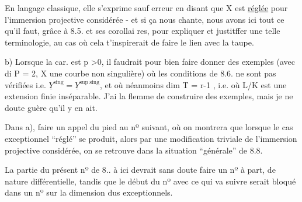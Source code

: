 

En langage classique, elle s'exprime  sauf erreur en disant
que X est \uline{réglée} pour l'immersion projective considérée \hand{[}- et si ça nous
chante, nous avons ici  tout ce qu'il faut, grâce à 8.5. et ses corollai
res, pour expliquer et justitffer une telle terminologie, au cas où cela
t'inspirerait de faire le lien avec la taupe\over{)}{]}. 

b)  Lorsque la car. est p >0, il faudrait pour bien faire donner
des exemples (avec di P = 2, X une courbe non singulière) où  les
conditions de 8.6. ne sont pas vérifiées i.e. $\underline{Y}^{\mathrm{sing}} = \underline{Y}^{\mathrm{sup\ sing}}$, et où
néanmoins  dim T = r-1 , i.e.  où  L/K est une extension finie
inséparable.  J'ai la flemme de construire des exemples, mais je ne
doute guère qu'il y en ait.

 Dans a), faire un appel du pied au  nº suivant,
où on montrera que lorsque le cas exceptionnel ``réglé'' se produit, alors 
par une modification triviale de l'immersion projective considérée, on
se retrouve dans la situation  ``générale''  de 8.8.

La partie du présent nº de 8.. à ici  devrait sans doute faire
un nº à part, de nature différentielle,  tandis que le début du nº avec
ce qui va suivre serait bloqué dans un nº  sur  la dimension dus
exceptionnels. 

